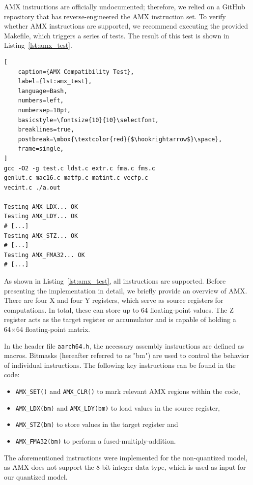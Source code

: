 \documentclass[modern,longauthor]{aastex7}
\begin{document}
AMX instructions are officially undocumented; therefore, we relied on a GitHub repository that has reverse-engineered the AMX instruction set. To verify whether AMX instructions are supported, we recommend executing the provided Makefile, which triggers a series of tests. The result of this test is shown in Listing~\ref{lst:amx_test}.

\begin{lstlisting}[
    caption={AMX Compatibility Test},
    label={lst:amx_test},
    language=Bash,
    numbers=left,
    numbersep=10pt,
    basicstyle=\fontsize{10}{10}\selectfont,
    breaklines=true,
    postbreak=\mbox{\textcolor{red}{$\hookrightarrow$}\space},
    frame=single,
]
gcc -O2 -g test.c ldst.c extr.c fma.c fms.c 
genlut.c mac16.c matfp.c matint.c vecfp.c 
vecint.c ./a.out

Testing AMX_LDX... OK
Testing AMX_LDY... OK
# [...]
Testing AMX_STZ... OK
# [...]
Testing AMX_FMA32... OK
# [...]
\end{lstlisting}

As shown in Listing~\ref{lst:amx_test}, all instructions are supported. Before presenting the implementation in detail, we briefly provide an overview of AMX. There are four X and four Y registers, which serve as source registers for computations. In total, these can store up to 64 floating-point values. The Z register acts as the target register or accumulator and is capable of holding a 64×64 floating-point matrix.

In the header file \texttt{aarch64.h}, the necessary assembly instructions are defined as macros. Bitmasks (hereafter referred to as "bm") are used to control the behavior of individual instructions. The following key instructions can be found in the code:

\begin{itemize}
    \item \texttt{AMX\_SET()} and \texttt{AMX\_CLR()} to mark relevant AMX regions within the code,
    \item \texttt{AMX\_LDX(bm)} and \texttt{AMX\_LDY(bm)} to load values in the source register,
    \item \texttt{AMX\_STZ(bm)} to store values in the target register and
    \item \texttt{AMX\_FMA32(bm)} to perform a fused-multiply-addition.
\end{itemize}

The aforementioned instructions were implemented for the non-quantized model, as AMX does not support the 8-bit integer data type, which is used as input for our quantized model.
\end{document}
